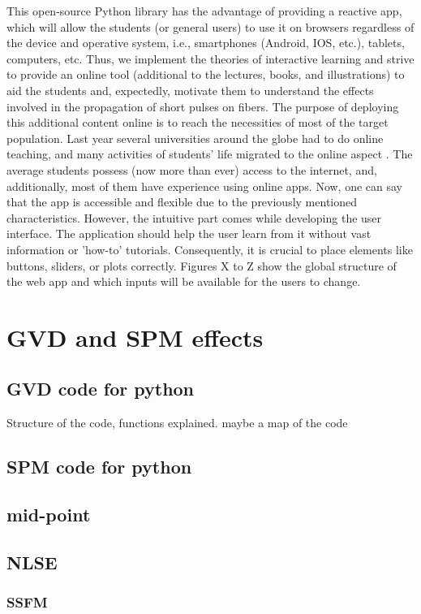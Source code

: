     This open-source Python library has the advantage of providing a reactive app, which will allow the students (or general users) to use it on browsers regardless of the device and operative system, i.e., smartphones (Android, IOS, etc.), tablets, computers, etc. Thus, we implement the theories of interactive learning and strive to provide an online tool (additional to the lectures, books, and illustrations) to aid the students and, expectedly, motivate them to understand the effects involved in the propagation of short pulses on fibers. 
    The purpose of deploying this additional content online is to reach the necessities of most of the target population. Last year several universities around the globe had to do online teaching, and many activities of students' life migrated to the online aspect \citep{Hassel2020}. The average students possess (now more than ever) access to the internet, and, additionally, most of them have experience using online apps. Now, one can say that the app is accessible and flexible due to the previously mentioned characteristics. However, the intuitive part comes while developing the user interface. The application should help the user learn from it without vast information or 'how-to' tutorials. Consequently, it is crucial to place elements like buttons, sliders, or plots correctly. Figures X to Z show the global structure of the web app and which inputs will be available for the users to change. 
    

        

\section{GVD and SPM effects}
    
    \subsection{GVD code for python}
    Structure of the code, functions explained. maybe a map of the code
    \subsection{SPM code for python}
        \subsection{mid-point}
    \subsection{NLSE}
        \subsubsection{SSFM}